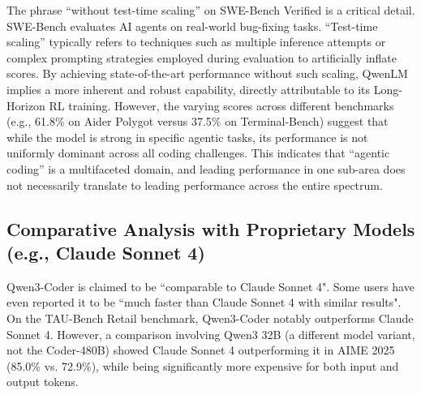 The phrase ``without test-time scaling'' on SWE-Bench Verified is a critical detail.\cite{fortuneindia_qwen3coder_2025, qwenlm_qwen3coder_blog_2025, svenson_qwen3coder_medium_2025, apidog_qwen3coder_2025, investing_qwen3coder_2025, reddit_localllama_qwen3coder_3_2025, marktechpost_qwen3coder_2025, youtube_qwen3coder_leading_2025, willison_qwen3coder_2025} SWE-Bench evaluates AI agents on real-world bug-fixing tasks.\cite{swebench_verified_2025, warp_swebench_2025} ``Test-time scaling'' typically refers to techniques such as multiple inference attempts or complex prompting strategies employed during evaluation to artificially inflate scores. By achieving state-of-the-art performance without such scaling, QwenLM implies a more inherent and robust capability, directly attributable to its Long-Horizon RL training. However, the varying scores across different benchmarks (e.g., 61.8\% on Aider Polygot versus 37.5\% on Terminal-Bench) suggest that while the model is strong in specific agentic tasks, its performance is not uniformly dominant across all coding challenges. This indicates that ``agentic coding'' is a multifaceted domain, and leading performance in one sub-area does not necessarily translate to leading performance across the entire spectrum.

\subsection{Comparative Analysis with Proprietary Models (e.g., Claude Sonnet 4)}

Qwen3-Coder is claimed to be ``comparable to Claude Sonnet 4".\cite{qwenlm_qwen3coder_blog_2025, llmstats_claude_qwen3_2025, gupta_qwen3coder_medium_2025, ainvest_qwen3coder_2025, github_qwenlm_qwen3coder_2025, reddit_localllama_qwen3coder_2_2025, investing_qwen3coder_2025, reddit_localllama_qwen3coder_3_2025, marktechpost_qwen3coder_2025, youtube_qwen3coder_leading_2025, willison_qwen3coder_2025} Some users have even reported it to be ``much faster than Claude Sonnet 4 with similar results".\cite{hackernews_qwen3coder_2025} On the TAU-Bench Retail benchmark, Qwen3-Coder notably outperforms Claude Sonnet 4.\cite{gupta_qwen3coder_medium_2025} However, a comparison involving Qwen3 32B (a different model variant, not the Coder-480B) showed Claude Sonnet 4 outperforming it in AIME 2025 (85.0\% vs. 72.9\%), while being significantly more expensive for both input and output tokens.\cite{llmstats_claude_qwen3_2025}


